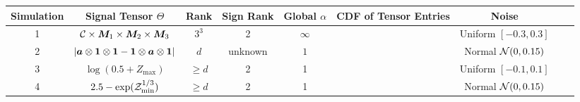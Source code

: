 \documentclass[10pt]{article}
\begin{document}
\renewcommand{\arraystretch}{1}

\begin{table}
\begin{tabular}{c|cccccccc}
Simulation &Signal Tensor $\Theta$ & Rank&  Sign Rank  & Global $\alpha $&CDF of Tensor Entries & Noise  \\
\hline
1&$\mathcal{C}\times\bm M_1\times\bm M_2\times\bm M_3$ &$3^3$&2& $\infty$& \multirow{4}{*}{
}
 &
Uniform $[-0.3,0.3]$\\
  \rowcolor{lightgray}
2& $|\bm{a}\otimes \mathbf{1}\otimes\mathbf{1}-\mathbf{1}\otimes\bm{a}\otimes \mathbf{1}|$& $d$&unknown&$1$&&
Normal $\mathcal{N}(0,0.15)$\\
3& $\log(0.5+Z_{\max})$&$\geq d$& 2& 1&&
Uniform $[-0.1,0.1]$\\
 \rowcolor{lightgray}
4& $2.5-\exp(\mathcal{Z}^{1/3}_{\min})$& $\geq d$ & 2 & 1 & &
Normal $\mathcal{N}(0,0.15)$
\end{tabular}
\end{table}
\end{document}
